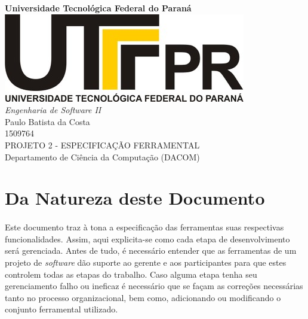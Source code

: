 \documentclass[12pt,a4paper]{article}
\author{Paulo Batista da Costa}
\title{}
\begin{document}
		\begin{titlepage}
	        \LARGE
	        	\begin{center}
	        	\vspace{5cm} 
	        	\textbf{Universidade Tecnológica Federal do Paraná \\ \vspace{1.8cm}}
	        	\includegraphics[scale=0.35]{logoutfpr.jpg} \\ \vspace{1.8cm}
	        	\textit{Engenharia de Software II} \vspace{2cm} \\
	        	Paulo Batista da Costa \\ 1509764 \vspace{2cm} \\ 
	        	PROJETO 2 - ESPECIFICAÇÃO FERRAMENTAL\vspace{2cm} \\
	        	Departamento de Ciência da Computação (DACOM) 
	        	
	        	\end{center}
	        \end{titlepage}	
	\tableofcontents
	\newpage
	\section{Da Natureza deste Documento}
	\paragraph{} Este documento traz à tona a especificação das ferramentas suas respectivas funcionalidades. Assim, aqui explicita-se como cada etapa de desenvolvimento será gerenciada. Antes de tudo, é necessário entender que as ferramentas de um projeto de \textit{software} dão suporte ao gerente e aos participantes para que estes controlem todas as etapas do trabalho. Caso alguma etapa tenha seu gerenciamento falho ou ineficaz é necessário que se façam as correções necessárias tanto no processo organizacional, bem como, adicionando ou modificando o conjunto ferramental utilizado.
\end{document}
